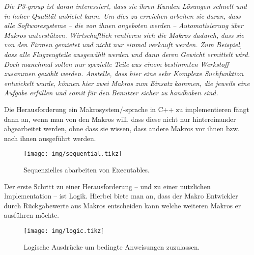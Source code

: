   \textit{%
    \color{DarkSlateGray}%
    Die P3-group ist daran interessiert, dass sie ihren Kunden Lösungen schnell und in hoher Qualität anbietet kann. Um dies zu erreichen arbeiten sie daran, dass alle Softwaresysteme -- die von ihnen angeboten werden -- Automatisierung über Makros unterstützen. Wirtschaftlich rentieren sich die Makros dadurch, dass sie von den Firmen gemietet und nicht nur einmal verkauft werden. Zum Beispiel, dass alle Flugzeugteile ausgewählt werden und dann deren Gewicht ermittelt wird. Doch manchmal sollen nur spezielle Teile aus einem bestimmten Werkstoff zusammen gezählt werden. Anstelle, dass hier eine sehr Komplexe Suchfunktion entwickelt wurde, können hier zwei Makros zum Einsatz kommen, die jeweils eine Aufgabe erfüllen und somit für den Benutzer sicher zu handhaben sind.
  }

  Die Herausforderung ein Makrosystem/-sprache in C++ zu implementieren fängt dann an, wenn man von den Makros will, dass diese nicht nur hintereinander abgearbeitet werden, ohne dass sie wissen, dass andere Makros vor ihnen bzw. nach ihnen ausgeführt werden.

  \begin{figure}[H]
    \centering
    \texttt{[image: img/sequential.tikz]}
    \caption{Sequenzielles abarbeiten von Executables.}
  \end{figure}

  Der erste Schritt zu einer Herausforderung -- und zu einer nützlichen Implementation -- ist Logik. Hierbei biete man an, dass der Makro Entwickler durch Rückgabewerte aus Makros entscheiden kann welche weiteren Makros er ausführen möchte.

  \begin{figure}[H]
    \centering
    \texttt{[image: img/logic.tikz]}
    \caption{Logische Ausdrücke um bedingte Anweisungen zuzulassen.}
  \end{figure}

